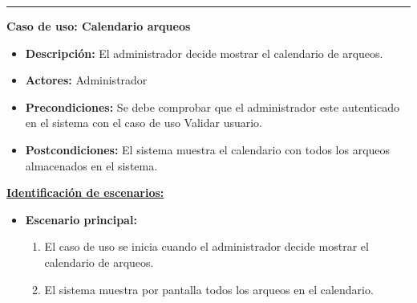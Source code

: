 \smallskip
\hrule height 1pt
\smallskip
\textbf{Caso de uso: Calendario arqueos}
\begin{itemize}\renewcommand{\labelitemi}{$\cdot$}
 \item \textbf{Descripción:} El administrador decide mostrar el calendario de arqueos.
  \item \textbf{Actores:} Administrador
  \item \textbf{Precondiciones:} Se debe comprobar que el administrador este autenticado en el sistema con el caso de uso Validar usuario.
  \item \textbf{Postcondiciones:} El sistema muestra el calendario con todos los arqueos almacenados en el sistema.
\end{itemize}
\underline{\textbf{Identificación de escenarios:}}
\begin{itemize}\renewcommand{\labelitemi}{$\circ$}
 \item \textbf{Escenario principal:}
         \begin{enumerate}
          \item El caso de uso se inicia cuando el administrador decide mostrar el calendario de arqueos.
	  \item El sistema muestra por pantalla todos los arqueos en el calendario.
         \end{enumerate}
\end{itemize}

